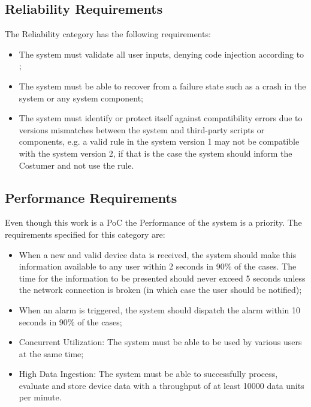 \subsection{Reliability Requirements}
\label{sec:requirements:non_functional:reliability}

The Reliability category has the following requirements:

\begin{itemize}
    \item The system must validate all user inputs, denying code injection according to \cite{top10};
    \item The system must be able to recover from a failure state such as a crash in the system or any system component;
    \item The system must identify or protect itself against compatibility errors due to versions mismatches between the system and third-party scripts or components, e.g. a valid rule in the system version 1 may not be compatible with the system version 2, if that is the case the system should inform the Costumer and not use the rule.
\end{itemize}

\subsection{Performance Requirements}
\label{sec:requirements:non_functional:performance}

Even though this work is a \gls{PoC} the Performance of the system is a priority. The requirements specified for this category are:

\begin{itemize}
    \item When a new and valid device data is received, the system should make this information available to any user within 2 seconds in 90\% of the cases. The time for the information to be presented should never exceed 5 seconds unless the network connection is broken (in which case the user should be notified);
    \item When an alarm is triggered, the system should dispatch the alarm within 10 seconds in 90\% of the cases;
    \item Concurrent Utilization: The system must be able to be used by various users at the same time;
    \item High Data Ingestion: The system must be able to successfully process, evaluate and store device data with a throughput of at least 10000 data units per minute.
\end{itemize}

